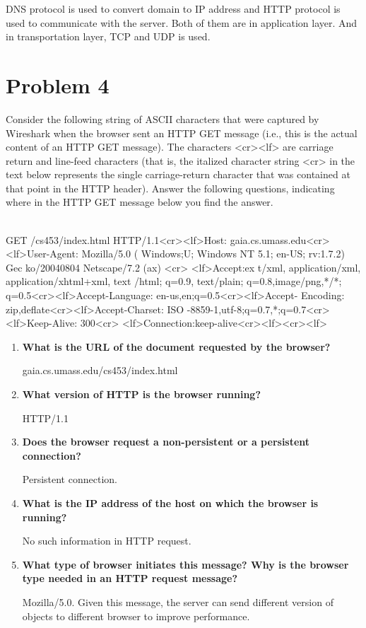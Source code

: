 \documentclass[11pt]{article}
\newenvironment{qparts}{\begin{enumerate}[{(}a{)}]}{\end{enumerate}}
\begin{document}
DNS protocol is used to convert domain to IP address and HTTP protocol is used to communicate with the server. Both of them are in application layer. And in transportation layer, TCP and UDP is used.
	


\newpage
\section{Problem 4}

Consider the following string of ASCII characters that were captured by Wireshark when the browser sent an HTTP GET message (i.e., this is the actual content of an HTTP GET message). The characters <cr><lf> are carriage return and line-feed characters (that is, the italized character string <cr> in the text below represents the single carriage-return character that was contained at that point in the HTTP header). Answer the following questions, indicating where in the HTTP GET message below you find the answer.

~\\

GET /cs453/index.html HTTP/1.1<cr><lf>Host: gaia.cs.umass.edu<cr><lf>User-Agent: Mozilla/5.0 ( Windows;U; Windows NT 5.1; en-US; rv:1.7.2) Gec ko/20040804 Netscape/7.2 (ax) <cr> <lf>Accept:ex t/xml, application/xml, application/xhtml+xml, text /html; q=0.9, text/plain; q=0.8,image/png,*/*; q=0.5<cr><lf>Accept-Language: en-us,en;q=0.5<cr><lf>Accept- Encoding: zip,deflate<cr><lf>Accept-Charset: ISO -8859-1,utf-8;q=0.7,*;q=0.7<cr><lf>Keep-Alive: 300<cr> <lf>Connection:keep-alive<cr><lf><cr><lf>

\begin{qparts}
	\item \textbf{What is the URL of the document requested by the browser?}
	
	gaia.cs.umass.edu/cs453/index.html
	

	\item  \textbf{What version of HTTP is the browser running?}

	HTTP/1.1
	
	\item  \textbf{Does the browser request a non-persistent or a persistent connection?}
	
	Persistent connection.
	
	\item  \textbf{What is the IP address of the host on which the browser is running?}
	
	No such information in HTTP request.
	
	\item  \textbf{What type of browser initiates this message? Why is the browser type needed in an HTTP request message?}
	
	Mozilla/5.0. Given this message, the server can send different version of objects to different browser to improve performance.
	

\end{qparts}
\end{document}
